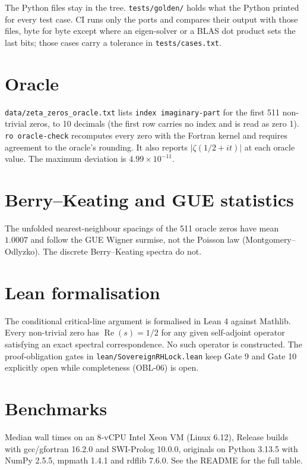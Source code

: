 \documentclass[11pt,letterpaper]{article}
\newcommand{\code}[1]{\texttt{#1}}
\begin{document}
The Python files stay in the tree. \code{tests/golden/} holds what the Python printed for every test case. CI runs only the ports and compares their output with those files, byte for byte except where an eigen-solver or a BLAS dot product sets the last bits; those cases carry a tolerance in \code{tests/cases.txt}.

\section{Oracle}
\label{sec:oracle}

\code{data/zeta\_zeros\_oracle.txt} lists \code{index imaginary-part} for the first 511 non-trivial zeros, to 10 decimals (the first row carries no index and is read as zero 1). \code{ro oracle-check} recomputes every zero with the Fortran kernel and requires agreement to the oracle's rounding. It also reports $|\zeta(1/2 + it)|$ at each oracle value. The maximum deviation is $4.99\times10^{-11}$.

\section{Berry--Keating and GUE statistics}
\label{sec:gue}

The unfolded nearest-neighbour spacings of the 511 oracle zeros have mean $1.0007$ and follow the GUE Wigner surmise, not the Poisson law (Montgomery--Odlyzko). The discrete Berry--Keating spectra do not.

\section{Lean formalisation}
\label{sec:lean}

The conditional critical-line argument is formalised in Lean 4 against Mathlib. Every non-trivial zero has $\operatorname{Re}(s) = 1/2$ for any given self-adjoint operator satisfying an exact spectral correspondence. No such operator is constructed. The proof-obligation gates in \code{lean/SovereignRHLock.lean} keep Gate 9 and Gate 10 explicitly open while completeness (OBL-06) is open.

\section{Benchmarks}
\label{sec:bench}

Median wall times on an 8-vCPU Intel Xeon VM (Linux 6.12), Release builds with gcc/gfortran 16.2.0 and SWI-Prolog 10.0.0, originals on Python 3.13.5 with NumPy 2.5.5, mpmath 1.4.1 and rdflib 7.6.0. See the README for the full table.
\end{document}
